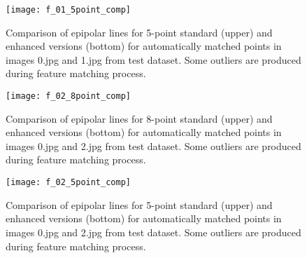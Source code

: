 \begin{figure}[h!]
    \centering
    \texttt{[image: f\_01\_5point\_comp]}
    \caption[Comparison of epipolar lines for 5-point standard and enhanced versions  - 1st example]{Comparison of epipolar lines for 5-point standard (upper) and enhanced versions (bottom) for automatically matched points in images 0.jpg and 1.jpg from test dataset. Some outliers are produced during feature matching process.}
    \label{fig:f_01_5point_comp}
\end{figure}

\begin{figure}[h!]
    \centering
    \texttt{[image: f\_02\_8point\_comp]}
    \caption[Comparison of epipolar lines for 8-point standard and enhanced versions  - 2nd example]{Comparison of epipolar lines for 8-point standard (upper) and enhanced versions (bottom) for automatically matched points in images 0.jpg and 2.jpg from test dataset. Some outliers are produced during feature matching process.}
    \label{fig:f_02_8point_epi_comp}
\end{figure}

\begin{figure}[h!]
    \centering
    \texttt{[image: f\_02\_5point\_comp]}
    \caption[Comparison of epipolar lines for 5-point standard and enhanced versions  - 2nd example]{Comparison of epipolar lines for 5-point standard (upper) and enhanced versions (bottom) for automatically matched points in images 0.jpg and 2.jpg from test dataset. Some outliers are produced during feature matching process.}
    \label{fig:f_02_5point_epi_comp}
\end{figure}


